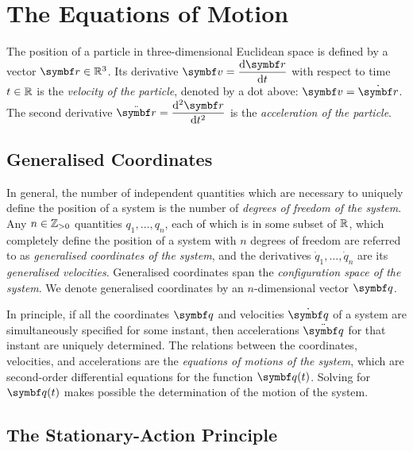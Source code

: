 



\section{The Equations of Motion}

The position of a particle in three-dimensional Euclidean space is defined by a vector \(\vct{r} \in \setreal^3\). Its
derivative \(\dis \vct{v} = \frac{\diff \vct{r}}{\diff t}\) with respect to time \(t \in \mathbb{R}\) is the
\emph{velocity of the particle}, denoted by a dot above: \(\vct{v} = \dot{\vct{r}}\). The second derivative \(\dis
\ddot{\vct{r}} = \frac{\diff^2 \vct{r}}{\diff t^2}\) is the \emph{acceleration of the particle}.

\subsection{Generalised Coordinates}

In general, the number of independent quantities which are necessary to uniquely define the position of a system is the
number of \emph{degrees of freedom of the system}. Any \(n \in \mathbb{Z}_{>0}\) quantities \(q_1, \ldots, q_n\), each of which
is in some subset of \(\mathbb{R}\), which completely define the position of a system with \(n\) degrees of freedom are
referred to as \emph{generalised coordinates of the system}, and the derivatives \(\dot{q}_1, \ldots, \dot{q}_n\) are
its \emph{generalised velocities}. Generalised coordinates span the \emph{configuration space of the system}. We denote
generalised coordinates by an \(n\)-dimensional vector \(\vct{q}\).

In principle, if all the coordinates \(\vct{q}\) and velocities \(\dot{\vct{q}}\) of a system are simultaneously
specified for some instant, then accelerations \(\ddot{\vct{q}}\) for that instant are uniquely determined. The
relations between the coordinates, velocities, and accelerations are the \emph{equations of motions of the system},
which are second-order differential equations for the function \(\vct{q}(t)\). Solving for \(\vct{q}(t)\) makes possible
the determination of the motion of the system.

\subsection{The Stationary-Action Principle}

